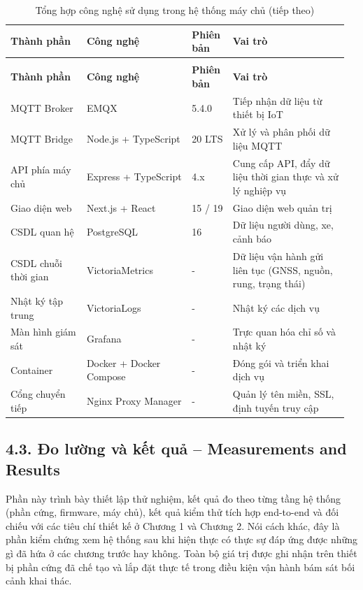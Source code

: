 \documentclass[a4paper]{extarticle}
\newcommand{\thesissettableid}[2]{%
  \renewcommand{\thetable}{#1}%
  \renewcommand{\theHtable}{#2}%
}
\begin{document}
{\thesissettableid{4.11A}{tab-ch4-tong-hop-cong-nghe-su-dung-trong-he-thong-cloud}
\def\LTcaptype{table}
\begin{longtable}{|L{0.214\linewidth}|L{0.299\linewidth}|L{0.115\linewidth}|L{0.327\linewidth}|}
\caption{Tổng hợp công nghệ sử dụng trong hệ thống máy chủ}\label{tab:ch4-tong-hop-cong-nghe-su-dung-trong-he-thong-cloud}\\
\hline \textbf{Thành phần} & \textbf{Công nghệ} & \textbf{Phiên bản} & \textbf{Vai trò} \\
\hline
\endfirsthead
\caption[]{Tổng hợp công nghệ sử dụng trong hệ thống máy chủ (tiếp theo)}\\
\hline \textbf{Thành phần} & \textbf{Công nghệ} & \textbf{Phiên bản} & \textbf{Vai trò} \\
\hline
\endhead
\hline
\endfoot
\endlastfoot
MQTT Broker & EMQX & 5.4.0 & Tiếp nhận dữ liệu từ thiết bị IoT \\\hline
MQTT Bridge & Node.js + TypeScript & 20 LTS & Xử lý và phân phối dữ liệu
MQTT \\\hline
API phía máy chủ & Express + TypeScript & 4.x & Cung cấp API, đẩy dữ
liệu thời gian thực và xử lý nghiệp vụ \\\hline
Giao diện web & Next.js + React & 15 / 19 & Giao diện web quản trị \\\hline
CSDL quan hệ & PostgreSQL & 16 & Dữ liệu người dùng, xe, cảnh báo \\\hline
CSDL chuỗi thời gian & VictoriaMetrics & - & Dữ liệu vận hành gửi liên tục (GNSS,
nguồn, rung, trạng thái) \\\hline
Nhật ký tập trung & VictoriaLogs & - & Nhật ký các dịch vụ \\\hline
Màn hình giám sát & Grafana & - & Trực quan hóa chỉ số và nhật ký \\\hline
Container & Docker + Docker Compose & - & Đóng gói và triển khai dịch
vụ \\\hline
Cổng chuyển tiếp & Nginx Proxy Manager & - & Quản lý tên miền, SSL,
định tuyến truy cập \\\hline
\end{longtable}
}


\subsection{4.3. Đo lường và kết quả -- Measurements and Results}\label{43-ux111o-lux1b0ux1eddng-vuxe0-kux1ebft-quux1ea3--measurements-and-results}

Phần này trình bày thiết lập thử nghiệm, kết quả đo theo từng tầng hệ
thống (phần cứng, firmware, máy chủ), kết quả kiểm thử tích hợp end-to-end
và đối chiếu với các tiêu chí thiết kế ở Chương 1 và Chương 2. Nói cách
khác, đây là phần kiểm chứng xem hệ thống sau khi hiện thực có thực sự
đáp ứng được những gì đã hứa ở các chương trước hay không. Toàn bộ giá
trị được ghi nhận trên thiết bị phần cứng đã chế tạo và lắp đặt thực tế
trong điều kiện vận hành bám sát bối cảnh khai thác.
\end{document}
